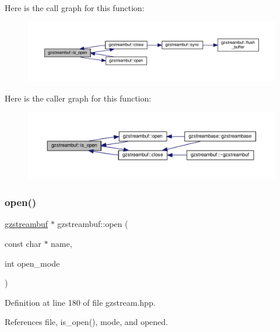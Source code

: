 Here is the call graph for this function\+:
\nopagebreak
\begin{figure}[H]
\begin{center}
\leavevmode
\includegraphics[width=350pt]{d7/de3/classgzstreambuf_a89e97aaae92b72d41c20223ed7e71308_cgraph}
\end{center}
\end{figure}
Here is the caller graph for this function\+:
\nopagebreak
\begin{figure}[H]
\begin{center}
\leavevmode
\includegraphics[width=350pt]{d7/de3/classgzstreambuf_a89e97aaae92b72d41c20223ed7e71308_icgraph}
\end{center}
\end{figure}
\mbox{\label{classgzstreambuf_af720bcd3058c97c90d11a3bcc57fda98}} 
\subsubsection{\texorpdfstring{open()}{open()}}
{\footnotesize\ttfamily \hyperlink{classgzstreambuf}{gzstreambuf} $\ast$ gzstreambuf\+::open (\begin{DoxyParamCaption}\item[{const char $\ast$}]{name,  }\item[{int}]{open\+\_\+mode }\end{DoxyParamCaption})\hspace{0.3cm}{\ttfamily [inline]}}



Definition at line 180 of file gzstream.\+hpp.



References file, is\+\_\+open(), mode, and opened.



